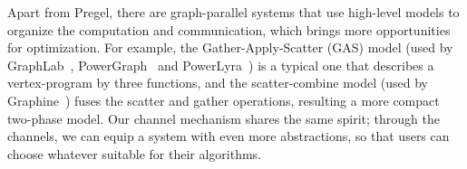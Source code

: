 \documentclass{sokendai_thesis} %
\newcommand{\PP}{Pregel+}
\begin{document}

Apart from Pregel, there are graph-parallel systems that use high-level models to organize the computation and communication, which brings more opportunities for optimization.
For example, the Gather-Apply-Scatter (GAS) model (used by GraphLab~\cite{graphlab}, PowerGraph~\cite{powergraph} and PowerLyra~\cite{powerlyra}) is a typical one that describes a vertex-program by three functions, and the scatter-combine model (used by Graphine~\cite{graphine}) fuses the scatter and gather operations, resulting a more compact two-phase model.
Our channel mechanism shares the same spirit;
through the channels, we can equip a system with even more abstractions, so that users can choose whatever suitable for their algorithms.
\end{document}

